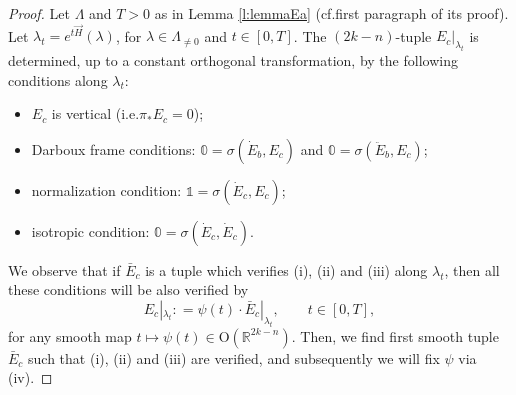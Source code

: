 \documentclass[11pt,a4paper]{article}
\theoremstyle{plain}
\theoremstyle{definition}
\theoremstyle{remark}
\numberwithin{equation}{section}
\newcommand{\R}{\mathbb{R}} %
\begin{document}
\begin{proof}
Let $\Lambda$ and $T>0$ as in Lemma \ref{l:lemmaEa} (cf.\@ first paragraph of its proof). Let $\lambda_t = e^{t\vec{H}}(\lambda)$, for $\lambda \in \Lambda_{\neq 0}$ and $t\in [0,T]$. The $(2k-n)$-tuple $E_c|_{\lambda_t}$ is determined, up to a constant orthogonal transformation, by the following conditions along $\lambda_t$:
\begin{itemize}
\item[(i)] $E_c$ is vertical (i.e.\@ $\pi_* E_c =0$);
\item[(ii)] Darboux frame conditions: $\mathbb{0}=\sigma(\dot{E}_b,E_c)$ and $\mathbb{0}=\sigma(\ddot{E}_b,E_c)$;
\item[(iii)] normalization condition: $\mathbb{1} = \sigma(\dot{E}_c,E_c)$;
\item[(iv)] isotropic condition: $\mathbb{0}=\sigma(\dot{E}_c,\dot{E}_c)$.
\end{itemize}
We observe that if $\bar{E}_c$ is a tuple which verifies (i), (ii) and (iii) along $\lambda_t$, then all these conditions will be also verified by
\begin{equation}
E_c|_{\lambda_t} : = \psi(t)\cdot \bar{E}_c|_{\lambda_t}, \qquad t\in [0,T],
\end{equation}
for any smooth map $t\mapsto \psi(t) \in \mathrm{O}(\R^{2k-n})$. Then, we find first smooth tuple $\bar{E}_c$ such that (i), (ii) and (iii) are verified, and subsequently we will fix $\psi$ via (iv). 


\end{proof}
\end{document}
